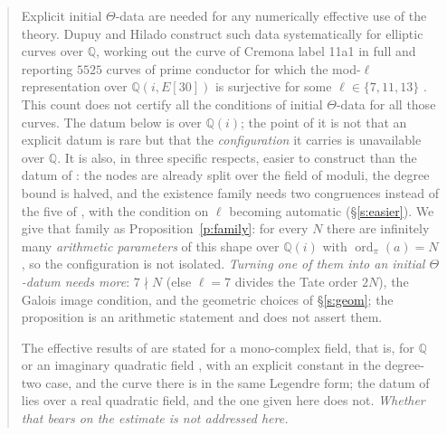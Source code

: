 \documentclass[11pt]{article}
\theoremstyle{plain}
\theoremstyle{definition}
\newcommand{\ord}{\operatorname{ord}}
\begin{document}
\begin{abstract}
Explicit initial $\Theta$-data are needed for any numerically effective use of the
theory.  Dupuy and Hilado \cite{DH25} construct such data systematically for elliptic
curves over $\mathbb{Q}$, working out the curve of Cremona label 11a1 in full and
reporting $5525$ curves of prime conductor for which the mod-$\ell$ representation
over $\mathbb Q(i,E[30])$ is surjective for some $\ell\in\{7,11,13\}$
\cite[\S2.11, p.~16]{DH25}.  This count does not certify all the conditions of
initial $\Theta$-data for all those curves.  The datum below is over
$\mathbb{Q}(i)$; the point of it is not that an explicit datum is rare but that the
\emph{configuration} it carries is unavailable over $\mathbb{Q}$.  It is also, in three
specific respects, easier to construct than the datum of \cite{First}: the nodes are
already split over the field of moduli, the degree bound is halved, and the existence
family needs two congruences instead of the five of \cite[Prop.~9.4]{Firstfull}, with
the condition on $\ell$ becoming automatic (\S\ref{s:easier}).  We give that family as
Proposition~\ref{p:family}: for every $N$ there are infinitely many \emph{arithmetic
parameters} of this shape over $\mathbb{Q}(i)$ with $\ord_\pi(a)=N$, so the
configuration is not isolated.  \emph{Turning one of them into an initial
$\Theta$-datum needs more}: $7\nmid N$ (else $\ell=7$ divides the Tate order $2N$), the
Galois image condition, and the geometric choices of \S\ref{s:geom}; the proposition is
an arithmetic statement and does not assert them.

The effective results of \cite{MFHMP} are stated for a mono-complex field, that is,
for $\mathbb{Q}$ or an imaginary quadratic field \cite[Thm.~A]{MFHMP}, with an
explicit constant in the degree-two case, and the curve there is in the same Legendre
form; the datum of \cite{First} lies over a real quadratic field, and the one given
here does not.  \emph{Whether that bears on the estimate is not addressed here.}


\end{abstract}
\end{document}
